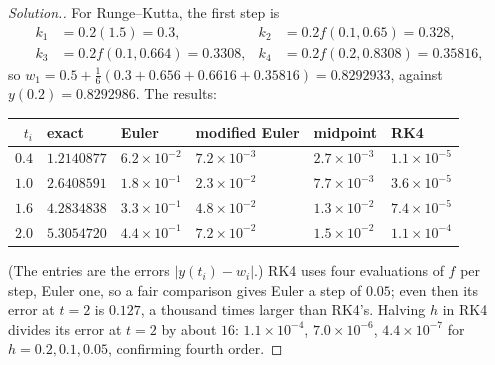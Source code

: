 \documentclass[11pt,a4paper]{article}
\numberwithin{equation}{section}
\theoremstyle{definition}
\newenvironment{solution}
  {\renewcommand{\qedsymbol}{}\begin{proof}[\textit{Solution}.]}
  {\end{proof}}
\begin{document}
\begin{solution}
For Runge--Kutta, the first step is
\begin{align*}
k_1 &= 0.2(1.5) = 0.3, & k_2 &= 0.2f(0.1,0.65) = 0.328,\\
k_3 &= 0.2f(0.1,0.664) = 0.3308, & k_4 &= 0.2f(0.2,0.8308) = 0.35816,
\end{align*}
so $w_1 = 0.5+\frac16(0.3+0.656+0.6616+0.35816) = 0.8292933$, against $y(0.2) = 0.8292986$. The results:
\begin{center}
\begin{tabular}{rlllll}
\hline
$t_i$ & exact & Euler & modified Euler & midpoint & RK4\\
\hline
$0.4$ & $1.2140877$ & $6.2\times10^{-2}$ & $7.2\times10^{-3}$ & $2.7\times10^{-3}$ & $1.1\times10^{-5}$\\
$1.0$ & $2.6408591$ & $1.8\times10^{-1}$ & $2.3\times10^{-2}$ & $7.7\times10^{-3}$ & $3.6\times10^{-5}$\\
$1.6$ & $4.2834838$ & $3.3\times10^{-1}$ & $4.8\times10^{-2}$ & $1.3\times10^{-2}$ & $7.4\times10^{-5}$\\
$2.0$ & $5.3054720$ & $4.4\times10^{-1}$ & $7.2\times10^{-2}$ & $1.5\times10^{-2}$ & $1.1\times10^{-4}$\\
\hline
\end{tabular}
\end{center}
(The entries are the errors $|y(t_i)-w_i|$.) RK4 uses four evaluations of $f$ per step, Euler one, so a fair comparison gives Euler a step of
$0.05$; even then its error at $t = 2$ is $0.127$, a thousand times larger than RK4's. Halving $h$ in RK4 divides its error at $t = 2$ by about
$16$: $1.1\times10^{-4}$, $7.0\times10^{-6}$, $4.4\times10^{-7}$ for $h = 0.2, 0.1, 0.05$, confirming fourth order.
\end{solution}
\end{document}
